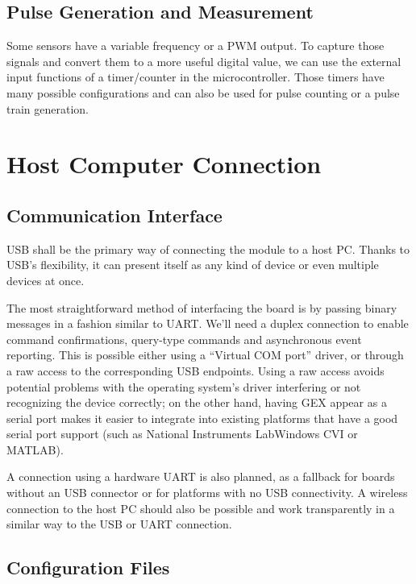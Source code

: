 \subsection{Pulse Generation and Measurement}

Some sensors have a variable frequency or a \gls{PWM} output. To capture those signals and convert them to a more useful digital value, we can use the external input functions of a timer/counter in the microcontroller. Those timers have many possible configurations and can also be used for pulse counting or a pulse train generation.

\section{Host Computer Connection}

\subsection{Communication Interface}

\gls{USB} shall be the primary way of connecting the module to a host \gls{PC}. Thanks to \gls{USB}'s flexibility, it can present itself as any kind of device or even multiple devices at once.

The most straightforward method of interfacing the board is by passing binary messages in a fashion similar to \gls{UART}. We'll need a duplex connection to enable command confirmations, query-type commands and asynchronous event reporting. This is possible either using a ``Virtual COM port'' driver, or through a raw access to the corresponding \gls{USB} endpoints. Using a raw access avoids potential problems with the operating system's driver interfering or not recognizing the device correctly; on the other hand, having GEX appear as a serial port makes it easier to integrate into existing platforms that have a good serial port support (such as National Instruments LabWindows CVI or MATLAB).

A connection using a hardware \gls{UART} is also planned, as a fallback for boards without an USB connector or for platforms with no \gls{USB} connectivity. A wireless connection to the host PC should also be possible and work transparently in a similar way to the \gls{USB} or \gls{UART} connection.

\subsection{Configuration Files}

